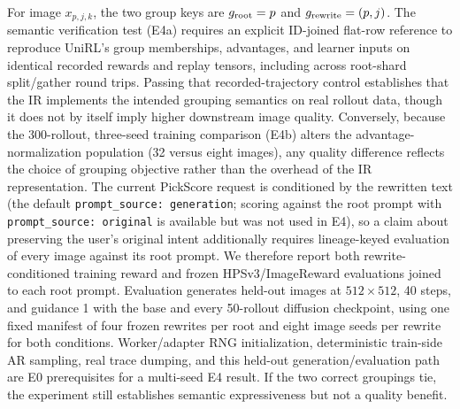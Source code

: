 \documentclass[10pt]{article}
\begin{document}
For image $x_{p,j,k}$, the two group keys are $g_{\rm root}=p$ and $g_{\rm rewrite}=(p,j)$.
The semantic verification test (E4a) requires an explicit ID-joined flat-row reference to reproduce UniRL's group memberships, advantages, and learner inputs on identical recorded rewards and replay tensors, including across root-shard split/gather round trips.
Passing that recorded-trajectory control establishes that the IR implements the intended grouping semantics on real rollout data, though it does not by itself imply higher downstream image quality.
Conversely, because the 300-rollout, three-seed training comparison (E4b) alters the advantage-normalization population (32 versus eight images), any quality difference reflects the choice of grouping objective rather than the overhead of the IR representation.
The current PickScore request is conditioned by the rewritten text (the default \texttt{prompt\_source: generation}; scoring against the root prompt with \texttt{prompt\_source: original} is available but was not used in E4), so a claim about preserving the user's original intent additionally requires lineage-keyed evaluation of every image against its root prompt.
We therefore report both rewrite-conditioned training reward and frozen HPSv3/ImageReward evaluations joined to each root prompt.
Evaluation generates held-out images at $512\times512$, 40 steps, and guidance 1 with the base and every 50-rollout diffusion checkpoint, using one fixed manifest of four frozen rewrites per root and eight image seeds per rewrite for both conditions.
Worker/adapter RNG initialization, deterministic train-side AR sampling, real trace dumping, and this held-out generation/evaluation path are E0 prerequisites for a multi-seed E4 result.
If the two correct groupings tie, the experiment still establishes semantic expressiveness but not a quality benefit.
\end{document}
